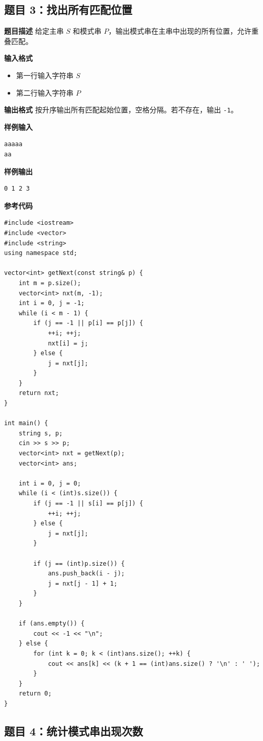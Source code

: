 \documentclass[12pt,a4paper]{article}
\begin{document}
\subsection*{题目 3：找出所有匹配位置}

\textbf{题目描述}  
给定主串 $S$ 和模式串 $P$，输出模式串在主串中出现的所有位置，允许重叠匹配。

\textbf{输入格式}
\begin{itemize}
    \item 第一行输入字符串 $S$
    \item 第二行输入字符串 $P$
\end{itemize}

\textbf{输出格式}  
按升序输出所有匹配起始位置，空格分隔。若不存在，输出 \texttt{-1}。

\textbf{样例输入}
\begin{lstlisting}
aaaaa
aa
\end{lstlisting}

\textbf{样例输出}
\begin{lstlisting}
0 1 2 3
\end{lstlisting}

\textbf{参考代码}
\begin{lstlisting}
#include <iostream>
#include <vector>
#include <string>
using namespace std;

vector<int> getNext(const string& p) {
    int m = p.size();
    vector<int> nxt(m, -1);
    int i = 0, j = -1;
    while (i < m - 1) {
        if (j == -1 || p[i] == p[j]) {
            ++i; ++j;
            nxt[i] = j;
        } else {
            j = nxt[j];
        }
    }
    return nxt;
}

int main() {
    string s, p;
    cin >> s >> p;
    vector<int> nxt = getNext(p);
    vector<int> ans;

    int i = 0, j = 0;
    while (i < (int)s.size()) {
        if (j == -1 || s[i] == p[j]) {
            ++i; ++j;
        } else {
            j = nxt[j];
        }

        if (j == (int)p.size()) {
            ans.push_back(i - j);
            j = nxt[j - 1] + 1;
        }
    }

    if (ans.empty()) {
        cout << -1 << "\n";
    } else {
        for (int k = 0; k < (int)ans.size(); ++k) {
            cout << ans[k] << (k + 1 == (int)ans.size() ? '\n' : ' ');
        }
    }
    return 0;
}
\end{lstlisting}

\subsection*{题目 4：统计模式串出现次数}
\end{document}
